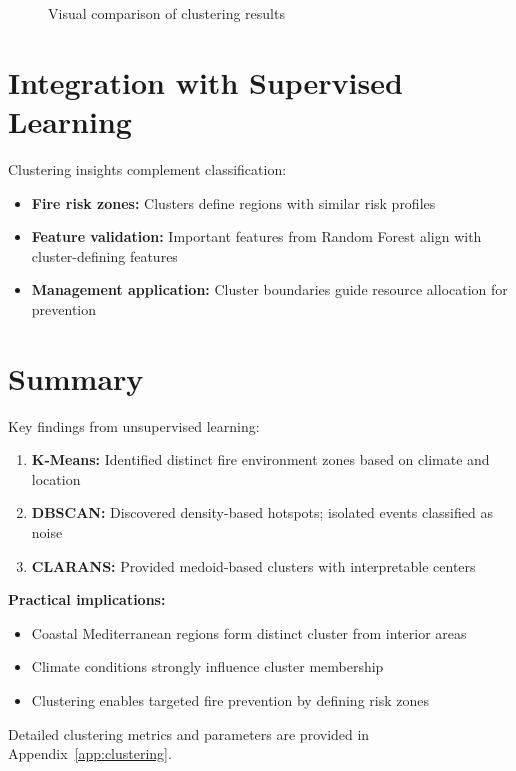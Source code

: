 \begin{figure}[H]
    \centering
    \caption{Visual comparison of clustering results}
    \label{fig:cluster_comparison}
\end{figure}

\section{Integration with Supervised Learning}
Clustering insights complement classification:
\begin{itemize}
    \item \textbf{Fire risk zones:} Clusters define regions with similar risk profiles
    \item \textbf{Feature validation:} Important features from Random Forest align with cluster-defining features
    \item \textbf{Management application:} Cluster boundaries guide resource allocation for prevention
\end{itemize}

\section{Summary}
Key findings from unsupervised learning:
\begin{enumerate}
    \item \textbf{K-Means:} Identified distinct fire environment zones based on climate and location
    \item \textbf{DBSCAN:} Discovered density-based hotspots; isolated events classified as noise
    \item \textbf{CLARANS:} Provided medoid-based clusters with interpretable centers
\end{enumerate}

\textbf{Practical implications:}
\begin{itemize}
    \item Coastal Mediterranean regions form distinct cluster from interior areas
    \item Climate conditions strongly influence cluster membership
    \item Clustering enables targeted fire prevention by defining risk zones
\end{itemize}

Detailed clustering metrics and parameters are provided in Appendix~\ref{app:clustering}.
